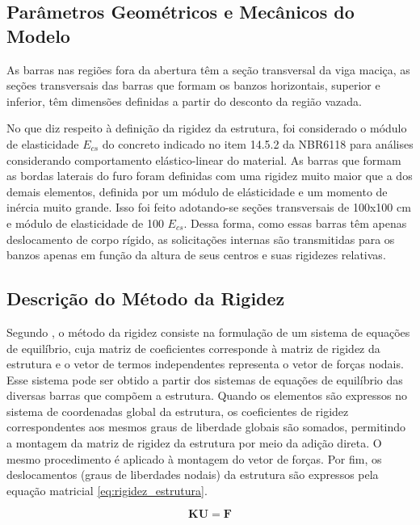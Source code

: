 \subsection{Parâmetros Geométricos e Mecânicos do Modelo}

As barras nas regiões fora da abertura têm a seção transversal da viga maciça, as seções transversais das barras que formam os banzos horizontais, superior e inferior, têm dimensões definidas a partir do desconto da região vazada.

No que diz respeito à definição da rigidez da estrutura, foi considerado o módulo de elasticidade $E_{cs}$ do concreto indicado no item 14.5.2 da NBR6118  para análises considerando comportamento elástico-linear do material. As barras que formam as bordas laterais do furo foram definidas com uma rigidez muito maior que a dos demais elementos, definida por um módulo de elásticidade e um momento de inércia muito grande. Isso foi feito adotando-se seções transversais de 100x100 cm e módulo de elasticidade de 100 $E_{cs}$. Dessa forma, como essas barras têm apenas deslocamento de corpo rígido, as solicitações internas são transmitidas para os banzos apenas em função da altura de seus centros e suas rigidezes relativas.

\subsection{Descrição do Método da Rigidez}

Segundo , o método da rigidez consiste na formulação de um sistema de equações de equilíbrio, cuja matriz de coeficientes corresponde à matriz de rigidez da estrutura e o vetor de termos independentes representa o vetor de forças nodais. Esse sistema pode ser obtido a partir dos sistemas de equações de equilíbrio das diversas barras que compõem a estrutura. Quando os elementos são expressos no sistema de coordenadas global da estrutura, os coeficientes de rigidez correspondentes aos mesmos graus de liberdade globais são somados, permitindo a montagem da matriz de rigidez da estrutura por meio da adição direta. O mesmo procedimento é aplicado à montagem do vetor de forças. Por fim, os deslocamentos (graus de liberdades nodais) da estrutura são expressos pela equação matricial \ref{eq:rigidez_estrutura}.

\begin{equation}
\mathbf{K}\mathbf{U} = \mathbf{F}
\label{eq:rigidez_estrutura}
\end{equation}

